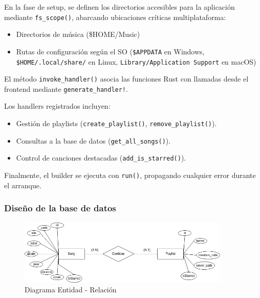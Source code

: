 \documentclass[11pt, a4paper]{article}
\begin{document}
            En la fase de setup, se definen los directorios accesibles para la aplicación mediante \texttt{fs\_scope()}, abarcando ubicaciones críticas multiplataforma:

            \begin{itemize}
                \item Directorios de música (\$HOME/Music)
                \item Rutas de configuración según el SO (\texttt{\$APPDATA} en Windows, \texttt{\$HOME/.local/share/} en Linux, \texttt{Library/Application Support} en macOS)
            \end{itemize}

            El método \texttt{invoke\_handler()} asocia las funciones Rust con llamadas desde el frontend mediante \texttt{generate\_handler!}.

            Los handlers registrados incluyen:

            \begin{itemize}
                \item Gestión de playlists (\texttt{create\_playlist()}, \texttt{remove\_playlist()}).
                \item Consultas a la base de datos (\texttt{get\_all\_songs()}).
                \item Control de canciones destacadas (\texttt{add\_is\_starred()}).
            \end{itemize}

            Finalmente, el builder se ejecuta con \texttt{run()}, propagando cualquier error durante el arranque.

            \subsubsection{Diseño de la base de datos}

            \begin{figure}[H]
              \centering
              \includegraphics[width=0.9\textwidth]{media/ER.drawio.png}
              \caption{Diagrama Entidad - Relación}
              \label{fig:er}
            \end{figure}
\end{document}

